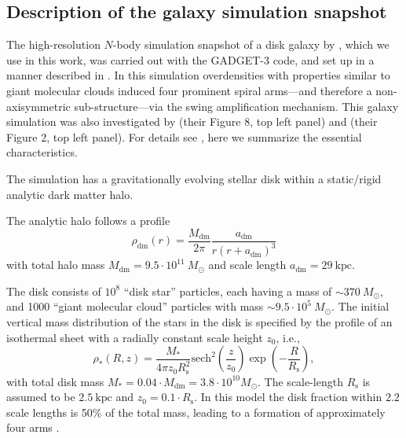 \documentclass[iop,revtex4,numberedappendix,appendixfloats]{emulateapj}
\begin{document}

\subsection{Description of the galaxy simulation snapshot} \label{sec:simulation_description}

The high-resolution $N$-body simulation snapshot of a disk galaxy by \citet{2013ApJ...766...34D}, which we use in this work, was carried out with the GADGET-3 code, and set up in a manner described in \citet{2005MNRAS.361..776S}. In this simulation overdensities with properties similar to giant molecular clouds induced four prominent spiral arms---and therefore a non-axisymmetric sub-structure---via the swing amplification mechanism. This galaxy simulation was also investigated by \citet{2013ApJ...766...34D} (their Figure 8, top left panel) and \citet{2015ApJ...808L...8D} (their Figure 2, top left panel). For details see \citet{2013ApJ...766...34D}, here we summarize the essential characteristics.

The simulation has a gravitationally evolving stellar disk within a static/rigid analytic dark matter halo.

The analytic halo follows a \citet{1990ApJ...356..359H} profile
\begin{equation}
\rho_\text{dm}(r) = \frac{M_\text{dm}}{2\pi} \frac{a_\text{dm}}{r (r+a_\text{dm})^3} \label{eq:dm_hernquist}
\end{equation}
with total halo mass $M_\text{dm} = 9.5\cdot 10^{11} ~M_\odot$ and scale length $a_\text{dm} = 29~\text{kpc}$.

The disk consists of $10^8$ ``disk star'' particles, each having a mass of $\sim370 ~M_\odot$, and 1000 ``giant molecular cloud'' particles with mass $\sim9.5\cdot 10^{5} ~M_\odot$. The initial vertical mass distribution of the stars in the disk is specified by the profile of an isothermal sheet with a radially constant scale height $z_0$, i.e.,
\begin{equation}
\rho_*(R,z) = \frac{M_*}{4\pi z_0 R_\text{s}^2} \text{sech}^2 \left( \frac{z}{z_0}\right) \exp \left(- \frac{R}{R_\text{s}} \right), \label{eq:sech_disk}
\end{equation}
with total disk mass $M_* = 0.04\cdot M_\text{dm} = 3.8\cdot 10^{10} M_\odot$. The scale-length $R_\text{s}$ is assumed to be $2.5~\text{kpc}$ and $z_0=0.1 \cdot R_\text{s}$. In this model the disk fraction within $2.2$ scale lengths is 50\% of the total mass, leading to a formation of approximately four arms \citep{2015ApJ...808L...8D}.
\end{document}
